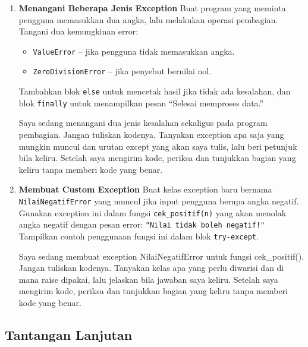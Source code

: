 \begin{enumerate}
    \item \textbf{Menangani Beberapa Jenis Exception}  
    Buat program yang meminta pengguna memasukkan dua angka, lalu melakukan operasi pembagian.  
    Tangani dua kemungkinan error:
    \begin{itemize}
        \item \texttt{ValueError} – jika pengguna tidak memasukkan angka.
        \item \texttt{ZeroDivisionError} – jika penyebut bernilai nol.
    \end{itemize}
    Tambahkan blok \texttt{else} untuk mencetak hasil jika tidak ada kesalahan, dan blok \texttt{finally} untuk menampilkan pesan “Selesai memproses data.”

      \begin{promptterarah}
      Saya sedang menangani dua jenis kesalahan sekaligus pada program pembagian. Jangan tuliskan kodenya. Tanyakan exception apa saja yang mungkin muncul dan urutan except yang akan saya tulis, lalu beri petunjuk bila keliru. Setelah saya mengirim kode, periksa dan tunjukkan bagian yang keliru tanpa memberi kode yang benar.
      \end{promptterarah}
    \item \textbf{Membuat Custom Exception}  
    Buat kelas exception baru bernama \texttt{NilaiNegatifError} yang muncul jika input pengguna berupa angka negatif.  
    Gunakan exception ini dalam fungsi \texttt{cek\_positif(n)} yang akan menolak angka negatif dengan pesan error:  
    \texttt{"Nilai tidak boleh negatif!"}  
    Tampilkan contoh penggunaan fungsi ini dalam blok \texttt{try-except}.
  \begin{promptterarah}
  Saya sedang membuat exception NilaiNegatifError untuk fungsi cek\_positif(). Jangan tuliskan kodenya. Tanyakan kelas apa yang perlu diwarisi dan di mana raise dipakai, lalu jelaskan bila jawaban saya keliru. Setelah saya mengirim kode, periksa dan tunjukkan bagian yang keliru tanpa memberi kode yang benar.
  \end{promptterarah}
\end{enumerate}

\subsection*{Tantangan Lanjutan}

